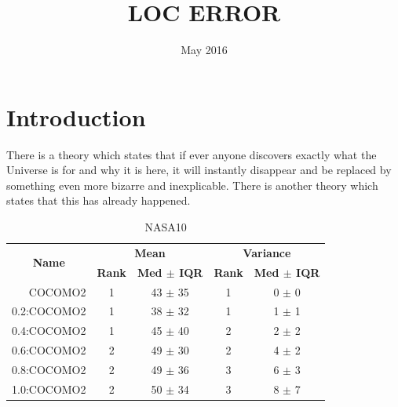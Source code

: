 \documentclass{article}
\title{LOC ERROR}
\author{ }
\date{May 2016}
\begin{document}
\maketitle

\section{Introduction}
There is a theory which states that if ever anyone discovers exactly what the Universe is for and why it is here, it will instantly disappear and be replaced by something even more bizarre and inexplicable.
There is another theory which states that this has already happened.


\begin{table}[!htpb]
\centering
\caption{NASA10}
\label{tab:nasa10}
\begin{tabular}{|r|c|c|c|c|}
\hline
\multicolumn{1}{|c|}{\multirow{2}{*}{\textbf{Name}}} & \multicolumn{2}{c|}{\textbf{Mean}}     & \multicolumn{2}{c|}{\textbf{Variance}} \\ \cline{2-5} 
\multicolumn{1}{|c|}{}                               & \textbf{Rank} & \textbf{Med $\pm$ IQR} & \textbf{Rank} & \textbf{Med $\pm$ IQR} \\ \hline
COCOMO2                                              & 1             & 43 $\pm$ 35            & 1             & 0 $\pm$ 0              \\
0.2:COCOMO2                                          & 1             & 38 $\pm$ 32            & 1             & 1 $\pm$ 1              \\ \cline{4-5}
0.4:COCOMO2                                          & 1             & 45 $\pm$ 40            & 2             & 2 $\pm$ 2              \\ \cline{2-3}
0.6:COCOMO2                                          & 2             & 49 $\pm$ 30            & 2             & 4 $\pm$ 2              \\ \cline{4-5}
0.8:COCOMO2                                          & 2             & 49 $\pm$ 36            & 3             & 6 $\pm$ 3              \\
1.0:COCOMO2                                          & 2             & 50 $\pm$ 34            & 3             & 8 $\pm$ 7    \\ \hline         
\end{tabular}
\end{table}
\end{document}
